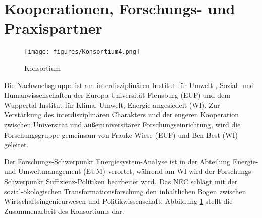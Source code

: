 \section{Kooperationen, Forschungs- und Praxispartner}
\label{sec:5}

\begin{figure}[!h]
    \centering
    \texttt{[image: figures/Konsortium4.png]}
    \caption{Konsortium}
    \label{fig:konsortium}
\end{figure}

Die Nachwuchsgruppe ist am interdisziplinären Institut für Umwelt-, Sozial- und Humanwissenschaften der Europa-Universität Flensburg (EUF) und dem Wuppertal Institut für Klima, Umwelt, Energie angesiedelt (WI).
Zur Verstärkung des interdisziplinären Charakters und der engeren Kooperation zwischen Universität und außeruniversitärer Forschungseinrichtung, wird die Forschungsgruppe gemeinsam von Frauke Wiese (EUF) und Ben Best (WI) geleitet.

Der Forschungs-Schwerpunkt Energiesystem-Analyse ist in der Abteilung Energie- und Umweltmanagement (EUM) verortet, während am WI wird der Forschungs-Schwerpunkt Suffizienz-Politiken bearbeitet wird. Das NEC schlägt mit der sozial-ökologischen Transformationsforschung den inhaltlichen Bogen zwischen Wirtschaftsingenieurwesen und Politikwissenschaft. Abbildung \ref{fig:konsortium} stellt die Zusammenarbeit des Konsortiums dar.


